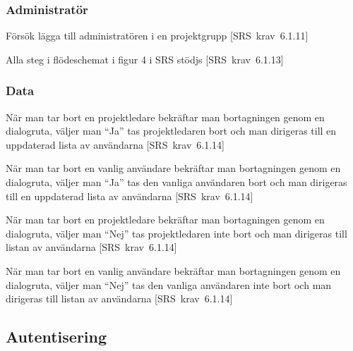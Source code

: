 \documentclass[a4paper]{article}
\def\reqinside{\hfil\penalty 100 \hfilneg \hbox}
\def \req [#1]{\reqinside{[SRS krav #1]}}
\begin{document}
\begin{appendices}
\subsubsection{Administratör}

\begin{FT}
\item
Försök lägga till administratören i en projektgrupp \req[6.1.11]

\item
Alla steg i flödeschemat i figur 4 i SRS stödjs \req[6.1.13]
\end{FT}

\subsubsection{Data}

\begin{FT}
\item När man tar bort en projektledare bekräftar man bortagningen genom en dialogruta, väljer man ``Ja'' tas projektledaren bort och man dirigeras till en uppdaterad lista av användarna \req[6.1.14]

\item När man tar bort en vanlig användare bekräftar man bortagningen genom en dialogruta, väljer man ``Ja'' tas den vanliga användaren bort och man dirigeras till en uppdaterad lista av användarna \req[6.1.14]

\item När man tar bort en projektledare bekräftar man bortagningen genom en dialogruta, väljer man ``Nej'' tas projektledaren inte bort och man dirigeras till listan av användarna \req[6.1.14]

\item När man tar bort en vanlig användare bekräftar man bortagningen genom en dialogruta, väljer man ``Nej'' tas den vanliga användaren inte bort och man dirigeras till listan av användarna \req[6.1.14]
\end{FT}







\subsection{Autentisering}

\end{appendices}
\end{document}
